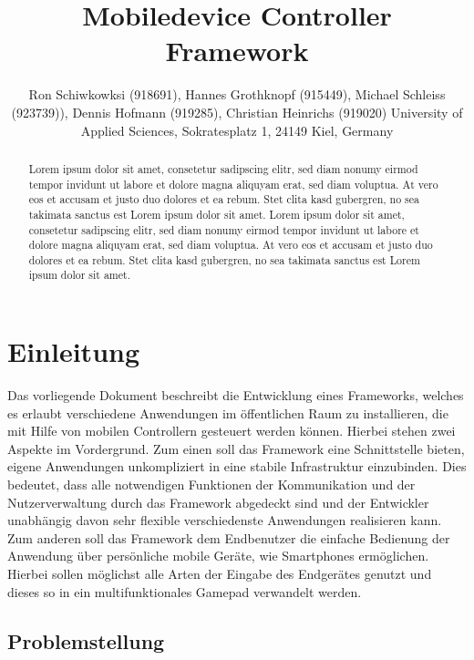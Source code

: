 \documentclass[a4paper]{spie}  %
\title{Mobiledevice Controller Framework} %
\author{ Ron Schiwkowksi  (918691), Hannes Grothknopf (915449), Michael Schleiss (923739)), Dennis Hofmann (919285), Christian Heinrichs (919020)
\skiplinehalf
University of Applied Sciences, Sokratesplatz 1, 24149 Kiel, Germany
}
\begin{document}
 
  \maketitle 
\begin{abstract} %
Lorem ipsum dolor sit amet, consetetur sadipscing elitr, sed diam nonumy eirmod tempor invidunt ut labore et dolore magna aliquyam erat, sed diam voluptua. At vero eos et accusam et justo duo dolores et ea rebum. Stet clita kasd gubergren, no sea takimata sanctus est Lorem ipsum dolor sit amet. Lorem ipsum dolor sit amet, consetetur sadipscing elitr, sed diam nonumy eirmod tempor invidunt ut labore et dolore magna aliquyam erat, sed diam voluptua. At vero eos et accusam et justo duo dolores et ea rebum. Stet clita kasd gubergren, no sea takimata sanctus est Lorem ipsum dolor sit amet.
\end{abstract}


\section{Einleitung} %
Das vorliegende Dokument beschreibt die Entwicklung eines Frameworks, welches es erlaubt verschiedene Anwendungen im öffentlichen Raum zu installieren, die mit Hilfe von mobilen Controllern gesteuert werden können. Hierbei stehen zwei Aspekte im Vordergrund. Zum einen soll das Framework eine Schnittstelle bieten, eigene Anwendungen unkompliziert in eine stabile Infrastruktur einzubinden. Dies bedeutet, dass alle notwendigen Funktionen der Kommunikation und der Nutzerverwaltung durch das Framework abgedeckt sind und der Entwickler unabhängig davon sehr flexible verschiedenste Anwendungen realisieren kann. Zum anderen soll das Framework dem Endbenutzer die einfache Bedienung der Anwendung über persönliche mobile Geräte, wie Smartphones ermöglichen. Hierbei sollen möglichst alle Arten der Eingabe des Endgerätes genutzt und dieses so in ein multifunktionales Gamepad verwandelt werden.

\subsection{Problemstellung}

\end{document}
